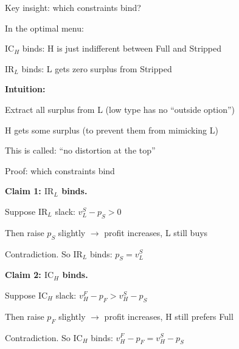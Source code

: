 \documentclass[notes,11pt, aspectratio=169]{beamer}
\newenvironment{wideitemize}{\itemize\addtolength{\itemsep}{10pt}}{\enditemize}
\begin{document}
\begin{frame}{Key insight: which constraints bind?}
	\begin{wideitemize}
		\item In the optimal menu:
		\begin{wideitemize}
			\vspace{5pt}
			\item $\text{IC}_H$ binds: H is just indifferent between Full and Stripped
			\item $\text{IR}_L$ binds: L gets zero surplus from Stripped
		\end{wideitemize}
		\item \textbf{Intuition:}
		\begin{wideitemize}
			\vspace{5pt}
			\item Extract all surplus from L (low type has no ``outside option'')
			\item H gets some surplus (to prevent them from mimicking L)
		\end{wideitemize}
		\item This is called: ``no distortion at the top''
	\end{wideitemize}
\end{frame}

\begin{frame}{Proof: which constraints bind}
	\begin{wideitemize}
		\item \textbf{Claim 1: $\text{IR}_L$ binds.}
		\begin{wideitemize}
			\vspace{3pt}
			\item Suppose $\text{IR}_L$ slack: $v_L^S - p_S > 0$
			\item Then raise $p_S$ slightly $\rightarrow$ profit increases, L still buys
			\item Contradiction. So $\text{IR}_L$ binds: $p_S = v_L^S$
		\end{wideitemize}
		\item \textbf{Claim 2: $\text{IC}_H$ binds.}
		\begin{wideitemize}
			\vspace{3pt}
			\item Suppose $\text{IC}_H$ slack: $v_H^F - p_F > v_H^S - p_S$
			\item Then raise $p_F$ slightly $\rightarrow$ profit increases, H still prefers Full
			\item Contradiction. So $\text{IC}_H$ binds: $v_H^F - p_F = v_H^S - p_S$
		\end{wideitemize}
	\end{wideitemize}
\end{frame}
\end{document}
